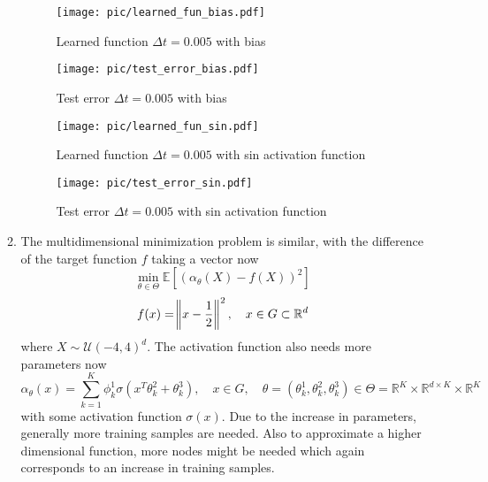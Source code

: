 \documentclass[a4paper,11pt]{scrartcl}
\newcommand*{\R}{\mathbb{R}}
\newcommand*{\EV}[1]{\mathbb{E}\left[{#1}\right]}
\newcommand*{\Dt}{\Delta{}t}
\begin{document}
\begin{enumerate}
\begin{enumerate}[leftmargin=1em]
    \begin{figure}[H]
        \begin{minipage}[t]{.5\linewidth}
          \centering
          \texttt{[image: pic/learned\_fun\_bias.pdf]}
          \caption{Learned function $\Dt=0.005$ with bias}
          \label{fig:learned_fun_bias}
        \end{minipage}%
        \begin{minipage}[t]{.5\linewidth}
          \centering
          \texttt{[image: pic/test\_error\_bias.pdf]}
          \caption{Test error $\Dt=0.005$ with bias}
          \label{fig:test_error_bias}
        \end{minipage}
    \end{figure}

    \begin{figure}[H]
        \begin{minipage}[b]{.5\linewidth}
          \centering
          \texttt{[image: pic/learned\_fun\_sin.pdf]}
          \caption{Learned function $\Dt=0.005$ with sin activation function}
          \label{fig:learned_fun_sin}
        \end{minipage}%
        \begin{minipage}[b]{.5\linewidth}
          \centering
          \texttt{[image: pic/test\_error\_sin.pdf]}
          \caption{Test error $\Dt=0.005$ with sin activation function}
          \label{fig:test_error_sin}
        \end{minipage}
    \end{figure}

    \item
      The multidimensional minimization problem is similar, with the difference
      of the target function $f$ taking a vector now
     \[\min_{\theta\in\Theta} \EV{\left( \alpha_\theta(X) - f(X) \right)^2}\]
     \[f(x) = \norm{x-\frac{1}{2}}^2, \quad x \in G \subset \R^d\]
      where $X \sim \mathcal{U}(-4, 4)^d$.
      The activation function also needs more parameters now
      \[\alpha_\theta(x) = \sum^K_{k=1}\phi_k^1\sigma\left( x^T \theta^2_k +
          \theta^3_k \right), \quad x \in G, \quad
        \theta = \left(\theta^1_k, \theta^2_k, \theta^3_k\right) \in \Theta = \R^K \times
        \R^{d\times K} \times \R^K\]
      with some activation function $\sigma(x)$.
      Due to the increase in parameters, generally more training samples are needed.
      Also to approximate a higher dimensional function, more nodes might be
      needed which again corresponds to an increase in training samples.


\end{enumerate}
\end{enumerate}
\end{document}
